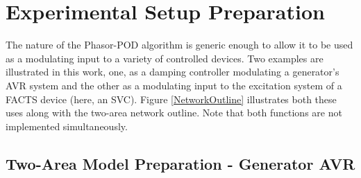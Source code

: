 \documentclass[journal]{IEEEtran}
\begin{document}
%



\section{Experimental Setup Preparation}\label{SetupPreparation}

The nature of the Phasor-POD algorithm is generic enough to allow it to be used as a modulating input to a variety of controlled devices. Two examples are illustrated in this work, one, as a damping controller modulating a generator\rq{s} AVR system and the other as a modulating input to the excitation system of a FACTS device (here, an SVC). Figure \ref{NetworkOutline} illustrates both these uses along with the two-area network outline. Note that both functions are not implemented simultaneously.
\vspace{-0.5em}
\subsection{Two-Area Model Preparation - Generator AVR}
\end{document}
